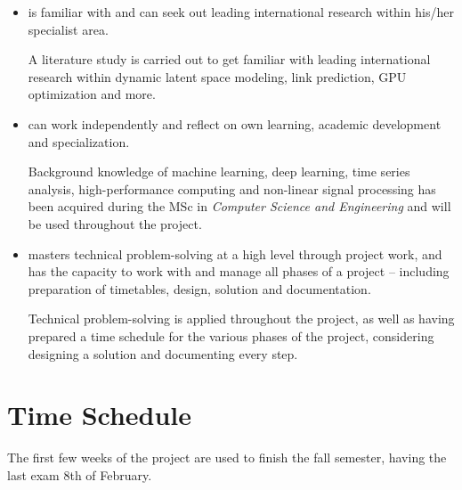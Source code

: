 \documentclass[]{article}
\begin{document}
\begin{itemize}
    \item is familiar with and can seek out leading international research within his/her specialist area.\par
    A literature study is carried out to get familiar with leading international research within dynamic latent space modeling, link prediction, GPU optimization and more.
    
    \item can work independently and reflect on own learning, academic development and specialization.\par
    Background knowledge of machine learning, deep learning, time series analysis, high-performance computing and non-linear signal processing has been acquired during the MSc in \emph{Computer Science and Engineering} and will be used throughout the project.
    
    \item masters technical problem-solving at a high level through project work, and has the capacity to work with and manage all phases of a project – including preparation of timetables, design, solution and documentation.\par
    Technical problem-solving is applied throughout the project, as well as having prepared a time schedule for the various phases of the project, considering designing a solution and documenting every step.
    
    
\end{itemize}


\section*{Time Schedule}

The first few weeks of the project are used to finish the fall semester, having the last exam 8th of February.
\end{document}
